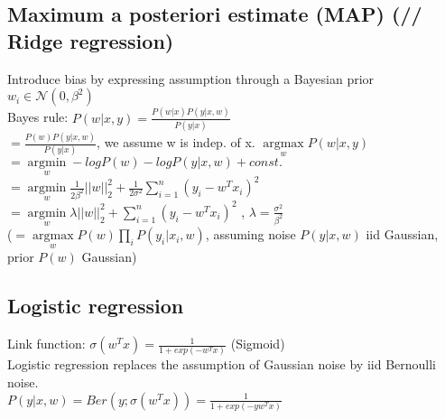\subsection*{Maximum a posteriori estimate (MAP) (// Ridge regression)}
Introduce bias by expressing assumption through a Bayesian prior $w_i \in \mathcal{N}(0, \beta^2)$\\
Bayes rule: $P(w|x,y) = \frac{P(w|x) P(y|x,w)}{P(y|x)}$\\
$ = \frac{P(w) P(y|x,w)}{P(y|x)}$, we assume w is indep. of x.
$ \underset{w}{\operatorname{argmax}} P(w|x,y)$\\ 
$= \underset{w}{\operatorname{argmin}} - log P(w) - log P(y|x,w) + const.$ \\
$= \underset{w}{\operatorname{argmin}} \frac{1}{2\beta^2} ||w||_2^2 + \frac{1}{2\sigma^2} \sum_{i=1}^n (y_i - w^Tx_i)^2$ \\
$= \underset{w}{\operatorname{argmin}} \lambda ||w||_2^2 + \sum_{i=1}^n (y_i - w^Tx_i)^2$ , $\lambda = \frac{\sigma^2}{\beta^2}$\\
($=\underset{w}{\operatorname{argmax}} P(w) \prod_i P(y_i|x_i,w)$, assuming noise $P(y|x,w)$ iid Gaussian, prior $P(w)$ Gaussian)

\subsection*{Logistic regression}
Link function: $\sigma(w^Tx) = \frac{1}{1+exp(-w^Tx)}$ (Sigmoid)\\
Logistic regression replaces the assumption of Gaussian noise by iid Bernoulli noise.\\
$P(y|x,w) = Ber(y; \sigma(w^Tx)) = \frac{1}{1+exp(-y w^T x)}$\\



